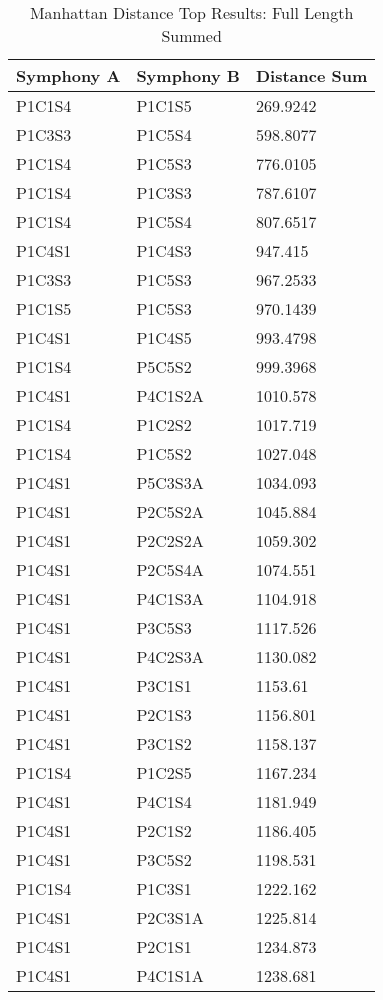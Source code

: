 \begin{longtable}{|l|l|l|}
\caption{Manhattan Distance Top Results: Full Length Summed}
\label{my-label}\\
\hline
Symphony A & Symphony B & Distance Sum \\ \hline
\endfirsthead
\endhead
%
P1C1S4 & P1C1S5 & 269.9242 \\ \hline
P1C3S3 & P1C5S4 & 598.8077 \\ \hline
P1C1S4 & P1C5S3 & 776.0105 \\ \hline
P1C1S4 & P1C3S3 & 787.6107 \\ \hline
P1C1S4 & P1C5S4 & 807.6517 \\ \hline
P1C4S1 & P1C4S3 & 947.415 \\ \hline
P1C3S3 & P1C5S3 & 967.2533 \\ \hline
P1C1S5 & P1C5S3 & 970.1439 \\ \hline
P1C4S1 & P1C4S5 & 993.4798 \\ \hline
P1C1S4 & P5C5S2 & 999.3968 \\ \hline
P1C4S1 & P4C1S2A & 1010.578 \\ \hline
P1C1S4 & P1C2S2 & 1017.719 \\ \hline
P1C1S4 & P1C5S2 & 1027.048 \\ \hline
P1C4S1 & P5C3S3A & 1034.093 \\ \hline
P1C4S1 & P2C5S2A & 1045.884 \\ \hline
P1C4S1 & P2C2S2A & 1059.302 \\ \hline
P1C4S1 & P2C5S4A & 1074.551 \\ \hline
P1C4S1 & P4C1S3A & 1104.918 \\ \hline
P1C4S1 & P3C5S3 & 1117.526 \\ \hline
P1C4S1 & P4C2S3A & 1130.082 \\ \hline
P1C4S1 & P3C1S1 & 1153.61 \\ \hline
P1C4S1 & P2C1S3 & 1156.801 \\ \hline
P1C4S1 & P3C1S2 & 1158.137 \\ \hline
P1C1S4 & P1C2S5 & 1167.234 \\ \hline
P1C4S1 & P4C1S4 & 1181.949 \\ \hline
P1C4S1 & P2C1S2 & 1186.405 \\ \hline
P1C4S1 & P3C5S2 & 1198.531 \\ \hline
P1C1S4 & P1C3S1 & 1222.162 \\ \hline
P1C4S1 & P2C3S1A & 1225.814 \\ \hline
P1C4S1 & P2C1S1 & 1234.873 \\ \hline
P1C4S1 & P4C1S1A & 1238.681 \\ \hline
\end{longtable}

